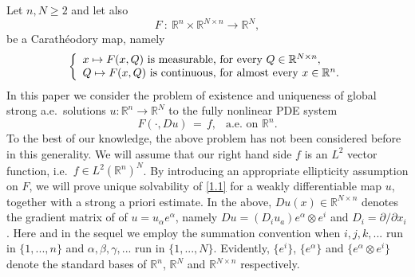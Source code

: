 \documentclass{amsart}
\theoremstyle{definition}
\numberwithin{equation}{section}
\begin{document}
Let $n,N\geq 2$ and let also
\[
F\ :\ {\mathbb{R}}^{n} {\times} {\mathbb{R}}^{N {\times} n} {\longrightarrow}  {\mathbb{R}}^N,
\]
be a Carath\'eodory map, namely
\[
\left\{
\begin{array}{l} 
x\mapsto F(x,Q) \text{ is measurable, for every } Q\in {\mathbb{R}}^{N{\times} n},{\medskip}\\
Q\mapsto F(x,Q) \text{ is continuous, for almost every } x\in {\mathbb{R}}^{n}.
\end{array}
\right.
\]
In this paper we consider the problem of existence and uniqueness of global strong a.e.\ solutions $u : {\mathbb{R}}^n {\longrightarrow} {\mathbb{R}}^N$ to the fully nonlinear PDE system
\begin{equation}  \label{1.1}
F(\cdot,Du ) \,=\, f, \ \ \text{ a.e.\ on }{\mathbb{R}}^n.
\end{equation}
To the best of our knowledge, the above problem has not been considered before in this generality. We will assume that our right hand side $f$ is an $L^2$ vector function, i.e.\ $ f\in L^2({\mathbb{R}}^n)^N$. By introducing an appropriate ellipticity assumption on $F$, we will prove unique solvability of \eqref{1.1} for a weakly differentiable map $u$, together with a strong a priori estimate. In the above, $Du(x) \in {\mathbb{R}}^{N{\times} n}$ denotes the gradient matrix of of $u=u_{\alpha} e^{\alpha}$, namely $Du=(D_iu_a) e^{\alpha} {\otimes} e^i$ and $D_i={\partial}/{\partial} x_i$. Here and in the sequel we employ the summation convention when $i,j,k,...$ run in $\{1,...,n\}$ and ${\alpha},{\beta},{\gamma},...$ run in $\{1,...,N\}$. Evidently, $\{e^i\}$, $\{e^{\alpha}\}$ and $\{e^{\alpha} {\otimes} e^i\}$ denote the standard bases of ${\mathbb{R}}^n$, ${\mathbb{R}}^N$ and ${\mathbb{R}}^{N{\times} n}$ respectively. 
\end{document}
